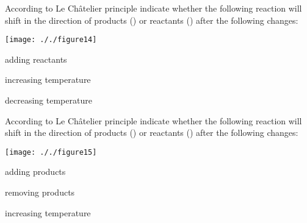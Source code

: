 \documentclass[main.tex]{subfiles}
\begin{document}
\begin{multicols*}{2}
\begin{question}[ID=\the\value{numA}]
According to Le Ch\^{a}telier principle indicate whether the following reaction will shift in the direction of products (\ce{->}) or reactants (\ce{<-}) after the following changes: 
  \begin{center}\texttt{[image: ././figure14]}\end{center}
  \begin{inparaenum}[(a)]
\item adding reactants %
\item increasing temperature %
\item decreasing temperature%
 \end{inparaenum}
\end{question}
\begin{solution}
  \begin{inparaenum}[(a)]
\item  \ce{->}
\item  \ce{<-}
\item  \ce{->}
 \end{inparaenum}
\hspace{0.1cm}\end{solution}%



\begin{question}[ID=\the\value{numA}]
According to Le Ch\^{a}telier principle indicate whether the following reaction will shift in the direction of products (\ce{->}) or reactants (\ce{<-}) after the following changes: 
  \begin{center}\texttt{[image: ././figure15]}\end{center}
  \begin{inparaenum}[(a)]
\item   adding products %
\item removing products%
\item increasing temperature %
 \end{inparaenum}
\end{question}
\begin{solution}
  \begin{inparaenum}[(a)]

\item    \ce{<-}
\item  \ce{->}
\item  \ce{->} 
 \end{inparaenum}
\hspace{0.1cm}\end{solution}%









\end{multicols*}
\end{document}
